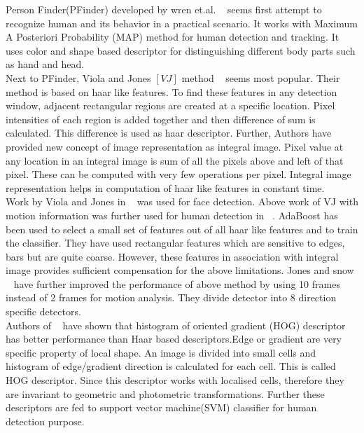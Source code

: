 \indent Person Finder(PFinder) developed by wren et.al. ~\cite{12} seems
first attempt to recognize human and its behavior in a practical
scenario. It works with Maximum A Posteriori Probability (MAP) method
for human detection and tracking. It uses color and shape based
descriptor for distinguishing different body parts such as hand and
head.\\

\indent Next to PFinder, Viola and Jones $[VJ]$ method ~\cite{16, 17}
seems most popular. Their method is based on haar like features. To find
these features in any detection window, adjacent rectangular regions are
created at a specific location. Pixel intensities of each region is
added together and then difference of sum is calculated. This difference
is used as haar descriptor. Further, Authors have provided new concept
of image representation as integral image.  Pixel value at any location
in an integral image is sum of all the pixels above and left of that
pixel.  These can be computed with very few operations per pixel.
Integral image representation helps in computation of haar like features
in constant time.\\

\indent Work by Viola and Jones in ~\cite{17} was used for face
detection.  Above work of VJ with motion information was further used
for human detection in ~\cite{16}.  AdaBoost has been used to select a
small set of features out of all haar like features and to train the
classifier. They have used rectangular features which are sensitive to
edges, bars but are quite coarse. However, these features in association
with integral image provides sufficient compensation for the above
limitations. Jones and snow ~\cite{26} have further improved the
performance of above method by using 10 frames instead of 2 frames for
motion analysis. They divide detector into 8 direction specific
detectors.\\

\indent Authors of ~\cite{20, 21} have shown that histogram of oriented
gradient (HOG) descriptor has better performance than Haar based
descriptors.Edge or gradient are very specific property of local shape.
An image is divided into small cells and histogram of edge/gradient
direction is calculated for each cell. This is called HOG descriptor.
Since this descriptor works with localised cells, therefore they are
invariant to geometric and photometric transformations. Further these
descriptors are fed to support vector machine(SVM) classifier for human
detection purpose.\\

